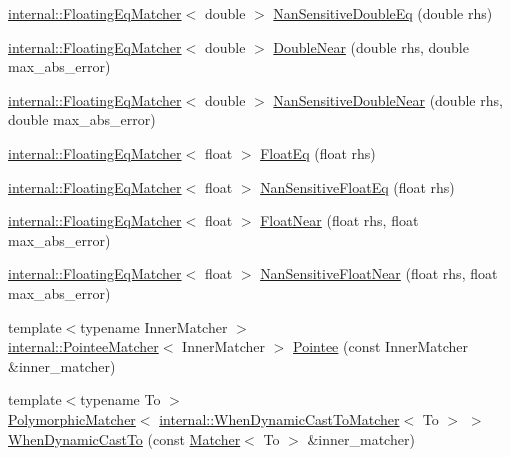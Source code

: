 \begin{DoxyCompactItemize}
\item 
\hyperlink{classtesting_1_1internal_1_1_floating_eq_matcher}{internal\+::\+Floating\+Eq\+Matcher}$<$ double $>$ \hyperlink{namespacetesting_aa83ee35256fd90033f615ef640245525}{Nan\+Sensitive\+Double\+Eq} (double rhs)
\item 
\hyperlink{classtesting_1_1internal_1_1_floating_eq_matcher}{internal\+::\+Floating\+Eq\+Matcher}$<$ double $>$ \hyperlink{namespacetesting_aaee08ecb6815ef8398bbcb4e56d56d44}{Double\+Near} (double rhs, double max\+\_\+abs\+\_\+error)
\item 
\hyperlink{classtesting_1_1internal_1_1_floating_eq_matcher}{internal\+::\+Floating\+Eq\+Matcher}$<$ double $>$ \hyperlink{namespacetesting_a3caa8177ef48150d0dde3a54b0961f7f}{Nan\+Sensitive\+Double\+Near} (double rhs, double max\+\_\+abs\+\_\+error)
\item 
\hyperlink{classtesting_1_1internal_1_1_floating_eq_matcher}{internal\+::\+Floating\+Eq\+Matcher}$<$ float $>$ \hyperlink{namespacetesting_ac75507edb7998957b48fb17a9b8a020b}{Float\+Eq} (float rhs)
\item 
\hyperlink{classtesting_1_1internal_1_1_floating_eq_matcher}{internal\+::\+Floating\+Eq\+Matcher}$<$ float $>$ \hyperlink{namespacetesting_ab3653439a654b85bdccff46d1436670d}{Nan\+Sensitive\+Float\+Eq} (float rhs)
\item 
\hyperlink{classtesting_1_1internal_1_1_floating_eq_matcher}{internal\+::\+Floating\+Eq\+Matcher}$<$ float $>$ \hyperlink{namespacetesting_a933a78452dd1770669bed758f35ff250}{Float\+Near} (float rhs, float max\+\_\+abs\+\_\+error)
\item 
\hyperlink{classtesting_1_1internal_1_1_floating_eq_matcher}{internal\+::\+Floating\+Eq\+Matcher}$<$ float $>$ \hyperlink{namespacetesting_a347ebf0075ca9470e71e8ac468c9818f}{Nan\+Sensitive\+Float\+Near} (float rhs, float max\+\_\+abs\+\_\+error)
\item 
{\footnotesize template$<$typename Inner\+Matcher $>$ }\\\hyperlink{classtesting_1_1internal_1_1_pointee_matcher}{internal\+::\+Pointee\+Matcher}$<$ Inner\+Matcher $>$ \hyperlink{namespacetesting_a5122ca3533f3a00f67e146dd81f3b68c}{Pointee} (const Inner\+Matcher \&inner\+\_\+matcher)
\item 
{\footnotesize template$<$typename To $>$ }\\\hyperlink{classtesting_1_1_polymorphic_matcher}{Polymorphic\+Matcher}$<$ \hyperlink{classtesting_1_1internal_1_1_when_dynamic_cast_to_matcher}{internal\+::\+When\+Dynamic\+Cast\+To\+Matcher}$<$ To $>$ $>$ \hyperlink{namespacetesting_aabfc320cc132d0a1da2a255b45a17b7a}{When\+Dynamic\+Cast\+To} (const \hyperlink{classtesting_1_1_matcher}{Matcher}$<$ To $>$ \&inner\+\_\+matcher)

\end{DoxyCompactItemize}
